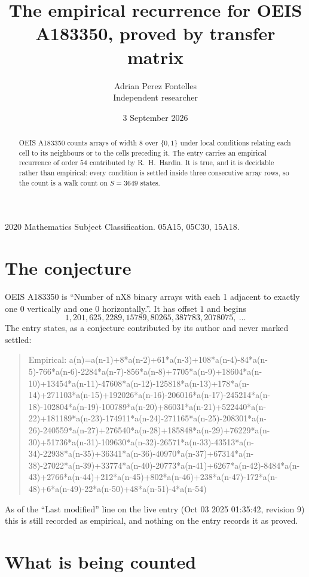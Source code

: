 \documentclass[11pt,a4paper]{article}
\title{The empirical recurrence for OEIS A183350, proved by transfer matrix}
\author{Adrian Perez Fontelles\\ \small Independent researcher}
\date{3 September 2026}
\theoremstyle{plain}
\theoremstyle{definition}
\begin{document}
\maketitle

\begin{abstract}
OEIS A183350 counts arrays of width $8$ over $\{0,1\}$ under local conditions relating each cell
to its neighbours or to the cells preceding it. The entry carries an empirical recurrence of
order $54$ contributed by R.~H.~Hardin. It is true, and it is decidable rather than
empirical: every condition is settled inside three consecutive array rows, so the count is a
walk count on $S=3649$ states.
\end{abstract}

\noindent\small 2020 Mathematics Subject Classification. 05A15, 05C30, 15A18.\normalsize

\section{The conjecture}

OEIS A183350 is ``Number of nX8 binary arrays with each 1 adjacent to exactly one 0 vertically and one 0 horizontally.''. It has offset $1$ and begins
\[
1, 201, 625, 2289, 15789, 80265, 387783, 2078075,\ \dots
\]
The entry states, as a conjecture contributed by its author and never marked settled:
\begin{quote}
Empirical: a(n)=a(n-1)+8*a(n-2)+61*a(n-3)+108*a(n-4)-84*a(n-5)-766*a(n-6)-2284*a(n-7)-856*a(n-8)+7705*a(n-9)+18604*a(n-10)+13454*a(n-11)-47608*a(n-12)-125818*a(n-13)+178*a(n-14)+271103*a(n-15)+192026*a(n-16)-206016*a(n-17)-245214*a(n-18)-102804*a(n-19)-100789*a(n-20)+86031*a(n-21)+522440*a(n-22)+181189*a(n-23)-174911*a(n-24)-271165*a(n-25)-208301*a(n-26)-240559*a(n-27)+276540*a(n-28)+185848*a(n-29)+76229*a(n-30)+51736*a(n-31)-109630*a(n-32)-26571*a(n-33)-43513*a(n-34)-22938*a(n-35)+36341*a(n-36)-40970*a(n-37)+67314*a(n-38)-27022*a(n-39)+33774*a(n-40)-20773*a(n-41)+6267*a(n-42)-8484*a(n-43)+2766*a(n-44)+212*a(n-45)+802*a(n-46)+238*a(n-47)-172*a(n-48)+6*a(n-49)-22*a(n-50)+48*a(n-51)-4*a(n-54)
\end{quote}
As of the ``Last modified'' line on the live entry (Oct 03 2025 01:35:42, revision 9) this is still
recorded as empirical, and nothing on the entry records it as proved.

\section{What is being counted}
\end{document}
